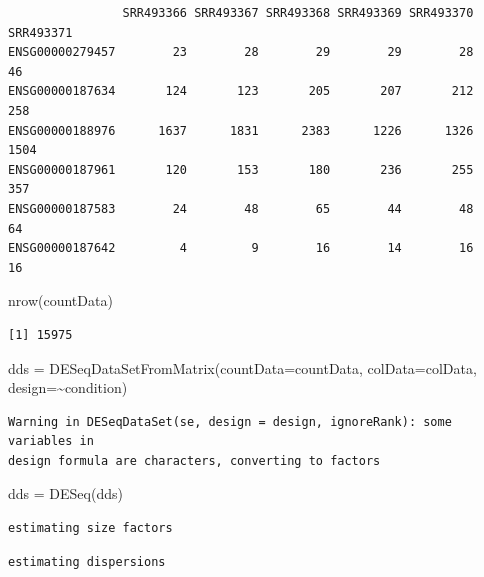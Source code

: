 \documentclass[
  letterpaper,
  DIV=11,
  numbers=noendperiod]{scrartcl}
\newenvironment{Shaded}{\begin{snugshade}}{\end{snugshade}}
\newcommand{\AttributeTok}[1]{\textcolor[rgb]{0.40,0.45,0.13}{#1}}
\newcommand{\FunctionTok}[1]{\textcolor[rgb]{0.28,0.35,0.67}{#1}}
\newcommand{\NormalTok}[1]{\textcolor[rgb]{0.00,0.23,0.31}{#1}}
\newcommand{\OtherTok}[1]{\textcolor[rgb]{0.00,0.23,0.31}{#1}}
\newcommand{\SpecialCharTok}[1]{\textcolor[rgb]{0.37,0.37,0.37}{#1}}
\begin{document}
\begin{verbatim}
                SRR493366 SRR493367 SRR493368 SRR493369 SRR493370 SRR493371
ENSG00000279457        23        28        29        29        28        46
ENSG00000187634       124       123       205       207       212       258
ENSG00000188976      1637      1831      2383      1226      1326      1504
ENSG00000187961       120       153       180       236       255       357
ENSG00000187583        24        48        65        44        48        64
ENSG00000187642         4         9        16        14        16        16
\end{verbatim}

\begin{Shaded}
\begin{Highlighting}[]
\FunctionTok{nrow}\NormalTok{(countData)}
\end{Highlighting}
\end{Shaded}

\begin{verbatim}
[1] 15975
\end{verbatim}

\begin{Shaded}
\begin{Highlighting}[]
\NormalTok{dds }\OtherTok{=} \FunctionTok{DESeqDataSetFromMatrix}\NormalTok{(}\AttributeTok{countData=}\NormalTok{countData,}
                             \AttributeTok{colData=}\NormalTok{colData,}
                             \AttributeTok{design=}\SpecialCharTok{\textasciitilde{}}\NormalTok{condition)}
\end{Highlighting}
\end{Shaded}

\begin{verbatim}
Warning in DESeqDataSet(se, design = design, ignoreRank): some variables in
design formula are characters, converting to factors
\end{verbatim}

\begin{Shaded}
\begin{Highlighting}[]
\NormalTok{dds }\OtherTok{=} \FunctionTok{DESeq}\NormalTok{(dds)}
\end{Highlighting}
\end{Shaded}

\begin{verbatim}
estimating size factors
\end{verbatim}

\begin{verbatim}
estimating dispersions
\end{verbatim}
\end{document}
